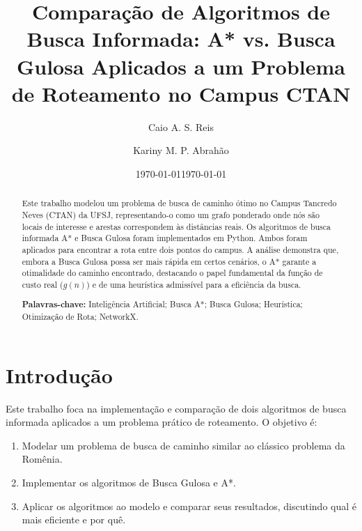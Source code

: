 \documentclass[12pt, a4paper]{article}
\title{Comparação de Algoritmos de Busca Informada: A* vs. Busca Gulosa Aplicados a um Problema de Roteamento no Campus CTAN}
\author[1]{Caio A. S. Reis}
\author[2]{Kariny M. P. Abrahão}
\affil[1]{Departamento de Ciência da Computação, Universidade Federal de São João del-Rei (UFSJ)}
\date{\today}
\date{\today} %
\begin{document}
\maketitle %

\begin{abstract}
    \noindent Este trabalho modelou um problema de busca de caminho ótimo no Campus Tancredo Neves (CTAN) da UFSJ, representando-o como um grafo ponderado onde nós são locais de interesse e arestas correspondem às distâncias reais. Os algoritmos de busca informada A* e Busca Gulosa foram implementados em Python. Ambos foram aplicados para encontrar a rota entre dois pontos do campus. A análise demonstra que, embora a Busca Gulosa possa ser mais rápida em certos cenários, o A* garante a otimalidade do caminho encontrado, destacando o papel fundamental da função de custo real ($g(n)$) e de uma heurística admissível para a eficiência da busca.

    \vspace{\baselineskip}
    \noindent\textbf{Palavras-chave:} Inteligência Artificial; Busca A*; Busca Gulosa; Heurística; Otimização de Rota; NetworkX.
\end{abstract}


\section{Introdução}

Este trabalho foca na implementação e comparação de dois algoritmos de busca informada aplicados a um problema prático de roteamento. O objetivo é:
\begin{enumerate}
    \item Modelar um problema de busca de caminho similar ao clássico problema da Romênia.
    \item Implementar os algoritmos de Busca Gulosa e A*.
    \item Aplicar os algoritmos ao modelo e comparar seus resultados, discutindo qual é mais eficiente e por quê.
\end{enumerate}
\end{document}
